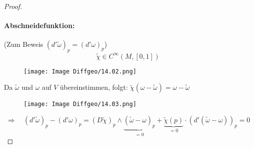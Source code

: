 \documentclass[fleqn, 12pt, letterpaper]{article}
\begin{document}
\begin{proof}
\paragraph{Abschneidefunktion:} (Zum Beweis \((d'\tilde{\omega})_p=(d'\omega)_p\))
\[
\widetilde{\chi} \in C^\infty(M, [0,1])
\]
  \begin{figure}[H]
    \centering
    \texttt{[image: Image Diffgeo/14.02.png]}
 \end{figure}
Da \( \widetilde{\omega} \) und \( \omega \) auf \( V \) übereinstimmen, folgt:
\(
\tilde{\chi}(\omega-\tilde{\omega})= \omega -\tilde{\omega}
\)
  \begin{figure}[H]
    \centering
    \texttt{[image: Image Diffgeo/14.03.png]}
 \end{figure}
\[
\Rightarrow \quad 
(d' \tilde{\omega})_p - (d' \omega)_p
= (D\tilde{\chi})_p \wedge \underbrace{(\tilde{\omega} - \omega)_p}_{=0}
+ \underbrace{\tilde{\chi}(p)}_{=0} \cdot (d'(\tilde{\omega} - \omega))_p
= 0
\]
\end{proof}

\end{document}
